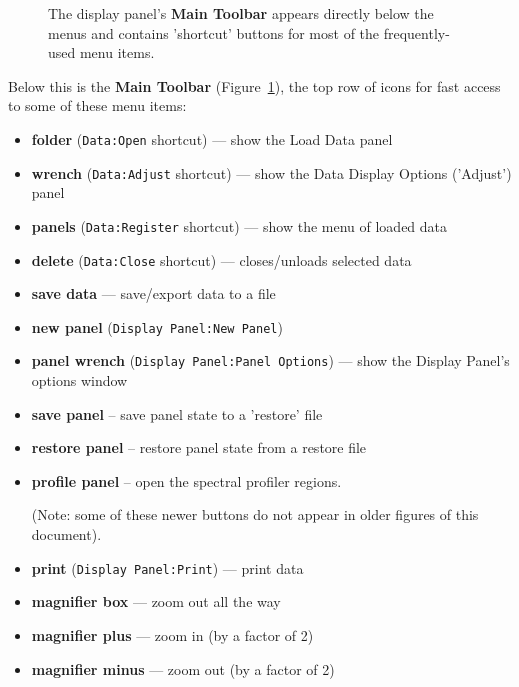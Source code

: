 \begin{figure}[h!]
\begin{center}
\caption{\label{fig:viewer_maintoolbar} The display panel's
{\bf Main Toolbar} appears directly below the menus and contains
'shortcut' buttons for most of the frequently-used menu items.}
\hrulefill
\end{center}
\end{figure}
Below this is the {\bf Main Toolbar} (Figure~\ref{fig:viewer_maintoolbar}),
the top row of icons for fast access to some of these menu items:
\begin{itemize}
   \item {\bf folder} ({\tt Data:Open} shortcut) --- show the Load Data panel
   \item {\bf wrench} ({\tt Data:Adjust} shortcut) --- show the Data Display
              Options ('Adjust') panel 
   \item {\bf panels} ({\tt Data:Register} shortcut) --- show the 
              menu of loaded data
   \item {\bf delete} ({\tt Data:Close} shortcut) --- closes/unloads 
              selected data
   \item {\bf save data} --- save/export data to a file
   \item {\bf new panel} ({\tt Display Panel:New Panel})
   \item {\bf panel wrench} ({\tt Display Panel:Panel Options}) --- show
              the Display Panel's options window 
   
   \item  {\bf save panel} -- save panel state to a 'restore' file
   \item  {\bf restore panel} -- restore panel state from a restore file
   \item  {\bf profile panel} -- open the spectral profiler
    regions.
    
    (Note: some of these newer buttons do not appear in older figures of
    this document).
   
   \item {\bf print} ({\tt Display Panel:Print}) --- print data
   \item {\bf magnifier box} --- zoom out all the way
   \item {\bf magnifier plus} --- zoom in (by a factor of 2)
   \item {\bf magnifier minus} --- zoom out (by a factor of 2)
\end{itemize}

